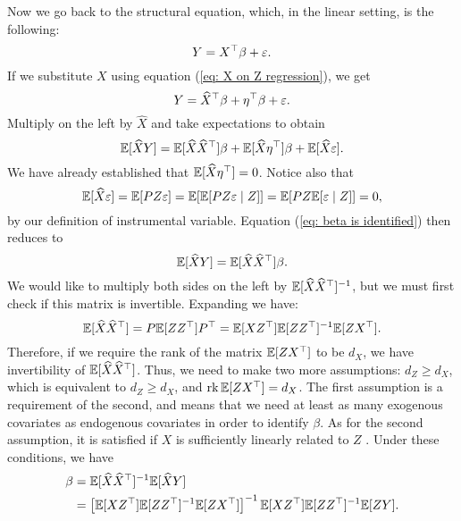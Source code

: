 Now we go back to the structural equation, which, in the linear setting, is the following:
\begin{equation}
    \label{eq: linear structural equation}
    Y = X^{ \top }\beta + \varepsilon
.\end{equation}
If we substitute $ X $ using equation (\ref{eq: X on Z regression}), we get
\begin{equation*}
    Y = \widehat{ X }^{ \top } \beta + \eta^{ \top } \beta + \varepsilon
.\end{equation*}
Multiply on the left by $ \hat{ X } $ and take expectations to obtain
\begin{equation}
    \label{eq: beta is identified}
    \mathbb{E} [ \widehat{ X } Y ] = \mathbb{E} [ \widehat{ X } \widehat{ X }^{ \top } ] \beta + \mathbb{E} [ \widehat{ X } \eta^{ \top } ] \beta + \mathbb{E} [ \widehat{ X } \varepsilon ]
.\end{equation}
We have already established that $ \mathbb{E} [ \widehat{ X } \eta^{ \top } ] = 0 $.
Notice also that
\begin{equation*}
    \mathbb{E} [ \widehat{ X } \varepsilon ]
    = \mathbb{E} [ PZ \varepsilon ]
    = \mathbb{E} [ \mathbb{E} [ PZ \varepsilon \mid Z ] ]
    = \mathbb{E} [ PZ \mathbb{E} [ \varepsilon \mid Z ] ]
    = 0
,\end{equation*}
by our definition of instrumental variable.
Equation (\ref{eq: beta is identified}) then reduces to
\begin{equation*}
    \mathbb{E} [ \widehat{ X } Y ] = \mathbb{E} [ \widehat{ X } \widehat{ X }^{ \top } ] \beta
.\end{equation*}
We would like to multiply both sides on the left by $ \mathbb{E} [ \widehat{ X } \widehat{ X }^{ \top } ]^{ -1 } $, but we must first check if this matrix is invertible.
Expanding we have:
\begin{equation*}
    \mathbb{E} [ \widehat{ X } \widehat{ X }^{ \top } ]
    = P \mathbb{E} [ Z Z^{ \top } ] P^{ \top }
    = \mathbb{E} [ X Z^{ \top } ] \mathbb{E} [ Z Z^{ \top } ]^{ -1 } \mathbb{E} [ Z X^{ \top } ]
.\end{equation*}
Therefore, if we require the rank of the matrix $ \mathbb{E} [ Z X^{ \top } ] $ to be $ d_{ X } $, we have invertibility of $ \mathbb{E} [ \widehat{ X } \widehat{ X }^{ \top } ] $.
Thus, we need to make two more assumptions: $ d_{ Z } \geq d_{ X } $, which is equivalent to $ d_{ Z } \geq d_{ X } $, and $ \operatorname{rk} \mathbb{E} [ Z X^{ \top } ] = d_{ X } $.
The first assumption is a requirement of the second, and means that we need at least as many exogenous covariates as endogenous covariates in order to identify $ \beta $.
As for the second assumption, it is satisfied if $ X $ is sufficiently linearly related to $ Z $ \cite{wooldridge2001}. Under these conditions, we have
\begin{align}
    \label{eq: beta reduced}
    \beta
    &= \mathbb{E} [ \widehat{ X } \widehat{ X }^{ \top } ]^{ -1 } \mathbb{E} [ \widehat{ X } Y ] \\
    &= \left[
        \mathbb{E} [ X Z^{ \top } ] \mathbb{E} [ Z Z^{ \top } ]^{ -1 } \mathbb{E} [ Z X^{ \top } ]
    \right]^{ -1 }
    \mathbb{E} [ X Z^{ \top } ] \mathbb{E} [ Z Z^{ \top } ]^{ -1 } \mathbb{E} [ Z Y ] \label{eq: beta expanded}
.\end{align}

